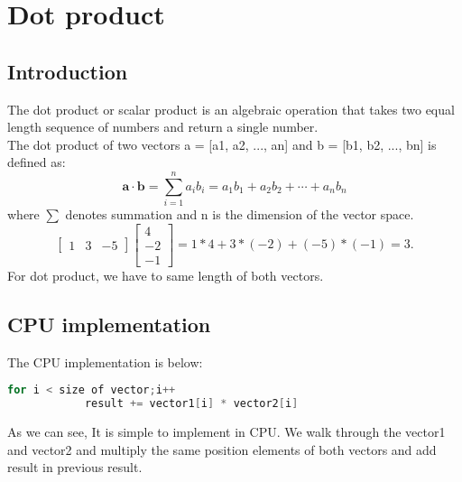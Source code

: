     \chapter{Dot product}
    \section{Introduction}
    The dot product or scalar product is an algebraic operation that takes two equal length sequence of numbers and return a single number.\\
 The dot product of two vectors a = [a1, a2, ..., an] and b = [b1, b2, ..., bn] is defined as:\\
 \begin{equation}
 	\mathbf {a} \cdot \mathbf {b} =\sum_{i=1}^{n}a_{i}b_{i}=a_{1}b_{1}+a_{2}b_{2}+\cdots +a_{n}b_{n}
 \end{equation}
where $\sum$ denotes summation and n is the dimension of the vector space.\\
\begin{equation}
	\begin{bmatrix}1&3&-5\end{bmatrix}
    	\begin{bmatrix}4\\-2\\-1\end{bmatrix}= 1*4+3*(-2)+(-5)*(-1) = 3.
\end{equation}
	For dot product, we have to same length of both vectors.
    \section{CPU implementation}
    The CPU implementation is below:\\
    \begin{lstlisting}[language=C, caption=vector dot product in C++]
    	for i < size of vector;i++
    		result += vector1[i] * vector2[i]
    \end{lstlisting}
    As we can see, It is simple to implement in CPU. We walk through the vector1 and vector2 and  multiply the same position elements of both vectors and add result in previous result.
